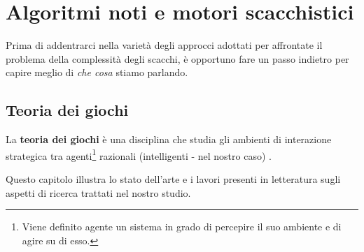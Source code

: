 \chapter{Algoritmi noti e motori scacchistici} %
%

Prima di addentrarci nella varietà degli approcci adottati per affrontate il problema della complessità degli scacchi, 
è opportuno fare un passo indietro per capire meglio di \textit{che cosa} stiamo parlando.

\section{Teoria dei giochi}
La \textbf{teoria dei giochi} è una disciplina che studia gli ambienti di interazione strategica tra
agenti\footnote{Viene definito agente un sistema in grado di percepire il suo ambiente e di agire su di esso.} razionali
(intelligenti - nel nostro caso) .
\begin{citazione}
Questo capitolo illustra lo stato dell'arte e i lavori presenti in letteratura sugli aspetti di ricerca trattati nel nostro studio. 

\end{citazione}

\newpage